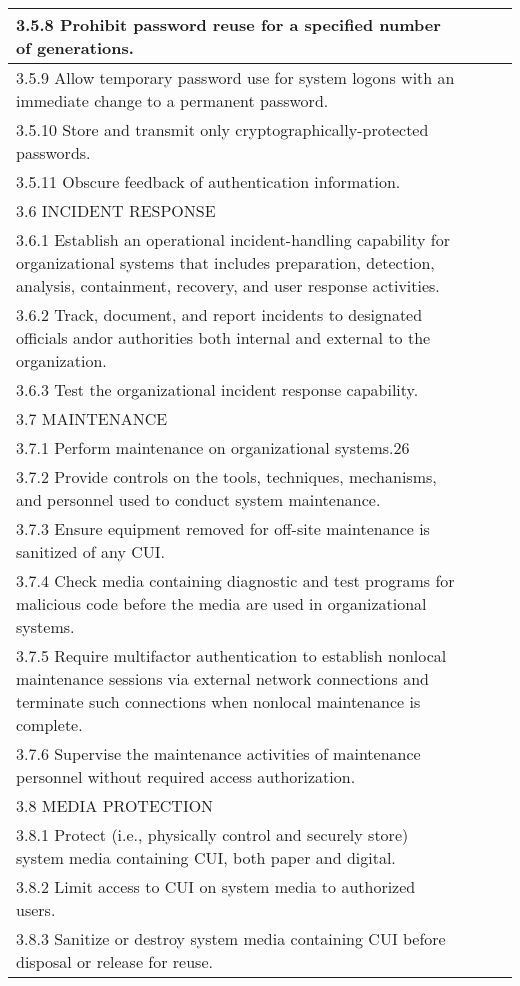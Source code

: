 \begin{longtable} {|p{}|p{}|p{}|p{} |}
{3.5.8 Prohibit password reuse for a specified number of generations.}&&& \\ \hline
{3.5.9 Allow temporary password use for system logons with an immediate change to a permanent password.}&&& \\ \hline
{3.5.10 Store and transmit only cryptographically-protected passwords.}&&& \\ \hline
{3.5.11 Obscure feedback of authentication information.}&&& \\ \hline
{3.6 INCIDENT RESPONSE}&&& \\ \hline
{3.6.1 Establish an operational incident-handling capability for organizational systems that includes preparation, detection, analysis, containment, recovery, and user response activities.}&&& \\ \hline
{3.6.2 Track, document, and report incidents to designated officials and\/or authorities both internal and external to the organization.}&&& \\ \hline
{3.6.3 Test the organizational incident response capability.}&&& \\ \hline
{3.7 MAINTENANCE}&&& \\ \hline
{3.7.1 Perform maintenance on organizational systems.26}&&& \\ \hline
{3.7.2 Provide controls on the tools, techniques, mechanisms, and personnel used to conduct system maintenance.}&&& \\ \hline
{3.7.3 Ensure equipment removed for off-site maintenance is sanitized of any CUI.}&&& \\ \hline
{3.7.4 Check media containing diagnostic and test programs for malicious code before the media are used in organizational systems.}&&& \\ \hline
{3.7.5 Require multifactor authentication to establish nonlocal maintenance sessions via external network connections and terminate such connections when nonlocal maintenance is complete.}&&& \\ \hline
{3.7.6 Supervise the maintenance activities of maintenance personnel without required access authorization.}&&& \\ \hline
{3.8 MEDIA PROTECTION}&&& \\ \hline
{3.8.1 Protect (i.e., physically control and securely store) system media containing CUI, both paper and digital.}&&& \\ \hline
{3.8.2 Limit access to CUI on system media to authorized users.}&&& \\ \hline
{3.8.3 Sanitize or destroy system media containing CUI before disposal or release for reuse.}&&& \\ \hline

\end{longtable}
